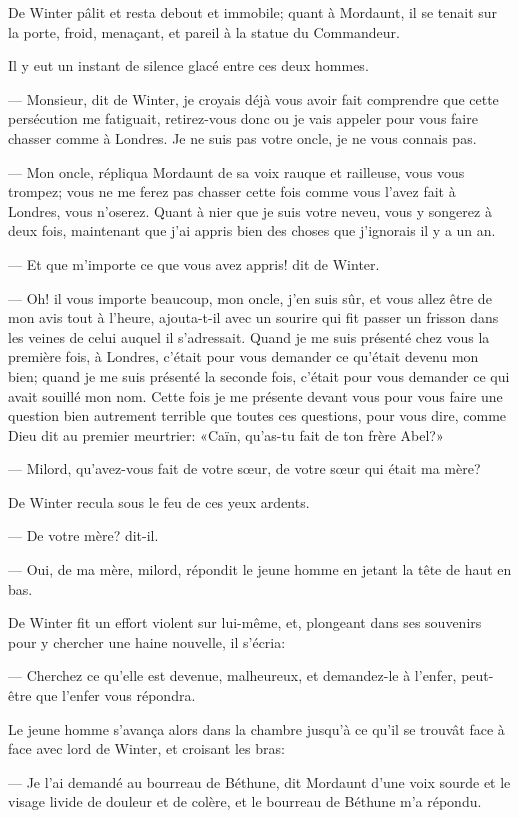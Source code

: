 De Winter pâlit et resta debout et immobile; quant à Mordaunt, il se tenait sur la porte, froid, menaçant, et pareil à la statue du Commandeur.

Il y eut un instant de silence glacé entre ces deux hommes.

— Monsieur, dit de Winter, je croyais déjà vous avoir fait comprendre que cette persécution me fatiguait, retirez-vous donc ou je vais appeler pour vous faire chasser comme à Londres. Je ne suis pas votre oncle, je ne vous connais pas.

— Mon oncle, répliqua Mordaunt de sa voix rauque et railleuse, vous vous trompez; vous ne me ferez pas chasser cette fois comme vous l'avez fait à Londres, vous n'oserez. Quant à nier que je suis votre neveu, vous y songerez à deux fois, maintenant que j'ai appris bien des choses que j'ignorais il y a un an.

— Et que m'importe ce que vous avez appris! dit de Winter.

— Oh! il vous importe beaucoup, mon oncle, j'en suis sûr, et vous allez être de mon avis tout à l'heure, ajouta-t-il avec un sourire qui fit passer un frisson dans les veines de celui auquel il s'adressait. Quand je me suis présenté chez vous la première fois, à Londres, c'était pour vous demander ce qu'était devenu mon bien; quand je me suis présenté la seconde fois, c'était pour vous demander ce qui avait souillé mon nom. Cette fois je me présente devant vous pour vous faire une question bien autrement terrible que toutes ces questions, pour vous dire, comme Dieu dit au premier meurtrier: «Caïn, qu'as-tu fait de ton frère Abel?»

— Milord, qu'avez-vous fait de votre sœur, de votre sœur qui était ma mère?

De Winter recula sous le feu de ces yeux ardents.

— De votre mère? dit-il.

— Oui, de ma mère, milord, répondit le jeune homme en jetant la tête de haut en bas.

De Winter fit un effort violent sur lui-même, et, plongeant dans ses souvenirs pour y chercher une haine nouvelle, il s'écria:

— Cherchez ce qu'elle est devenue, malheureux, et demandez-le à l'enfer, peut-être que l'enfer vous répondra.

Le jeune homme s'avança alors dans la chambre jusqu'à ce qu'il se trouvât face à face avec lord de Winter, et croisant les bras:

— Je l'ai demandé au bourreau de Béthune, dit Mordaunt d'une voix sourde et le visage livide de douleur et de colère, et le bourreau de Béthune m'a répondu.

